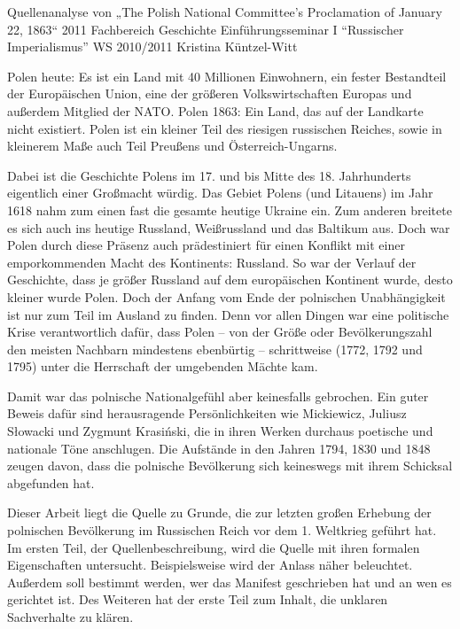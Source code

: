 \documentclass{../../sem_paper}
\begin{document}
\titlepg
{Quellenanalyse von „The Polish National Committee's
Proclamation of January 22, 1863“}
{2011}
{Fachbereich Geschichte}
{Einführungsseminar I "`Russischer Imperialismus"'}
{WS 2010/2011}
{Kristina Küntzel-Witt}

\tocpaper

Polen heute: Es ist ein Land mit 40 Millionen Einwohnern, ein fester Bestandteil der Europäischen
Union, eine der größeren Volkswirtschaften Europas und außerdem Mitglied der NATO.
Polen 1863: Ein Land, das auf der Landkarte nicht existiert. Polen ist ein kleiner Teil des riesigen
russischen Reiches, sowie in kleinerem Maße auch Teil Preußens und Österreich-Ungarns.

Dabei ist die Geschichte Polens im 17. und bis Mitte des 18. Jahrhunderts eigentlich einer
Großmacht würdig. Das Gebiet Polens (und Litauens) im Jahr 1618 nahm zum einen fast die
gesamte heutige Ukraine ein. Zum anderen breitete es sich auch ins heutige Russland, Weißrussland
und das Baltikum aus. Doch war Polen durch diese Präsenz auch prädestiniert für einen Konflikt mit
einer emporkommenden Macht des Kontinents: Russland. So war der Verlauf der Geschichte, dass
je größer Russland auf dem europäischen Kontinent wurde, desto kleiner wurde Polen. Doch der
Anfang vom Ende der polnischen Unabhängigkeit ist nur zum Teil im Ausland zu finden. Denn vor
allen Dingen war eine politische Krise verantwortlich dafür, dass Polen – von der Größe oder
Bevölkerungszahl den meisten Nachbarn mindestens ebenbürtig – schrittweise (1772, 1792 und
1795) unter die Herrschaft der umgebenden Mächte kam.

Damit war das polnische Nationalgefühl aber keinesfalls gebrochen. Ein guter Beweis dafür sind
herausragende Persönlichkeiten wie Mickiewicz, Juliusz Słowacki und Zygmunt Krasiński, die in
ihren Werken durchaus poetische und nationale Töne anschlugen. Die Aufstände in den Jahren
1794, 1830 und 1848 zeugen davon, dass die polnische Bevölkerung sich keineswegs mit ihrem
Schicksal abgefunden hat.

Dieser Arbeit liegt die Quelle zu Grunde, die zur letzten großen Erhebung der polnischen
Bevölkerung im Russischen Reich vor dem 1. Weltkrieg geführt hat.
Im ersten Teil, der Quellenbeschreibung, wird die Quelle mit ihren formalen Eigenschaften
untersucht. Beispielsweise wird der Anlass näher beleuchtet. Außerdem soll bestimmt werden, wer
das Manifest geschrieben hat und an wen es gerichtet ist. Des Weiteren hat der erste Teil zum Inhalt,
die unklaren Sachverhalte zu klären.
\end{document}
